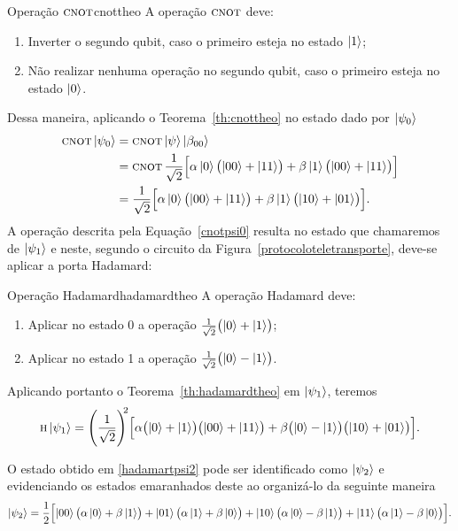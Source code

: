 \begin{theo}{Operação \(\operatorname{\textsc{cnot}}\)}{cnottheo}
  A operação \(\operatorname{\textsc{cnot}}\) deve:
  \begin{enumerate}[label=\roman*.,left=0pt]
    \item Inverter o segundo qubit, caso o primeiro esteja no estado $\ket{1}$;
    \item Não realizar nenhuma operação no segundo qubit, caso o primeiro esteja no estado $\ket{0}$.
  \end{enumerate}
\end{theo}

Dessa maneira, aplicando o Teorema~\ref{th:cnottheo} no estado dado por $\ket{\psi_0}$
\begin{align}\label{cnotpsi0}
  \operatorname{\textsc{cnot}} \ket{\psi_0} &= \operatorname{\textsc{cnot}} \ket{\psi} \ket{\beta_{00}} \nonumber \\
                     &= \operatorname{\textsc{cnot}} \frac{1}{\sqrt{2}} \Bigl[ \alpha \ket{0} \bigl( \ket{00} + \ket{11} \bigr) + \beta \ket{1} \bigl( \ket{00} + \ket{11} \bigr)\Bigr] \nonumber \\
                     &= \frac{1}{\sqrt{2}} \Bigl[\alpha \ket{0} \bigl( \ket{00} + \ket{11} \bigr) + \beta \ket{1} \bigl( \ket{10} + \ket{01} \bigr) \Bigr].
\end{align}
A operação descrita pela Equação~\eqref{cnotpsi0} resulta no estado que chamaremos de $\ket{\psi_1}$ e neste, segundo o circuito da Figura~\ref{protocoloteletransporte}, deve-se aplicar a porta Hadamard:
\begin{theo}{Operação Hadamard}{hadamardtheo}
  A operação Hadamard deve:
  \begin{enumerate}[label=\roman*.]
    \item Aplicar no estado 0 a operação $\frac{1}{\sqrt{2}} \bigl(\ket{0}+\ket{1}\bigr)$;
    \item Aplicar no estado 1 a operação $\frac{1}{\sqrt{2}} \bigl(\ket{0}-\ket{1}\bigr)$.
  \end{enumerate}
\end{theo}

Aplicando portanto o Teorema~\ref{th:hadamardtheo} em $\ket{\psi_1}$, teremos
\begin{equation}\label{hadamartpsi2}
 \operatorname{\textsc{h}} \ket{\psi_1} = \Biggl( \frac{1}{\sqrt{2}}\Biggr)^{\!\!2} \Bigl[ \alpha \bigl( \ket{0} + \ket{1} \bigr)\bigl( \ket{00} +\ket{11} \bigr)+ \beta \bigl( \ket{0} - \ket{1} \bigr) \bigl( \ket{10} + \ket{01} \bigr) \Bigr].
\end{equation}

O estado obtido em \eqref{hadamartpsi2} pode ser identificado como $\ket{\psi_2}$ e evidenciando os estados emaranhados deste ao organizá-lo da seguinte maneira
\begin{equation}\label{psi2}
 \ket{\psi_2} = \frac{1}{2} \Bigl[ \ket{00} \bigl( \alpha \ket{0} + \beta \ket{1} \bigr) + \ket{01} \bigl( \alpha \ket{1} + \beta \ket{0} \bigr) + \ket{10} \bigl( \alpha \ket{0} - \beta \ket{1} \bigr) + \ket{11} \bigl( \alpha \ket{1} - \beta \ket{0} \bigr) \Bigr].
\end{equation}

